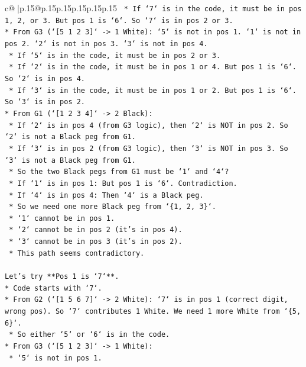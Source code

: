 \documentclass{article}
\begin{document}
{\begin{supertabular}{c@{$\;$}|p{.15\linewidth}@{}p{.15\linewidth}p{.15\linewidth}p{.15\linewidth}p{.15\linewidth}p{.15\linewidth}}
{{{\texttt{    *   If `7` is in the code, it must be in pos 1, 2, or 3. But pos 1 is `6`. So `7` is in pos 2 or 3.} \\
\texttt{*   From G3 (`{[}5 1 2 3{]}` {-}> 1 White): `5` is not in pos 1. `1` is not in pos 2. `2` is not in pos 3. `3` is not in pos 4.} \\
\texttt{    *   If `5` is in the code, it must be in pos 2 or 3.} \\
\texttt{    *   If `2` is in the code, it must be in pos 1 or 4. But pos 1 is `6`. So `2` is in pos 4.} \\
\texttt{    *   If `3` is in the code, it must be in pos 1 or 2. But pos 1 is `6`. So `3` is in pos 2.} \\
\texttt{*   From G1 (`{[}1 2 3 4{]}` {-}> 2 Black):} \\
\texttt{    *   If `2` is in pos 4 (from G3 logic), then `2` is NOT in pos 2. So `2` is not a Black peg from G1.} \\
\texttt{    *   If `3` is in pos 2 (from G3 logic), then `3` is NOT in pos 3. So `3` is not a Black peg from G1.} \\
\texttt{    *   So the two Black pegs from G1 must be `1` and `4`?} \\
\texttt{        *   If `1` is in pos 1: But pos 1 is `6`. Contradiction.} \\
\texttt{        *   If `4` is in pos 4: Then `4` is a Black peg.} \\
\texttt{    *   So we need one more Black peg from `\{1, 2, 3\}`.} \\
\texttt{        *   `1` cannot be in pos 1.} \\
\texttt{        *   `2` cannot be in pos 2 (it's in pos 4).} \\
\texttt{        *   `3` cannot be in pos 3 (it's in pos 2).} \\
\texttt{    *   This path seems contradictory.} \\
\\ 
\texttt{Let's try **Pos 1 is `7`**.} \\
\texttt{*   Code starts with `7`.} \\
\texttt{*   From G2 (`{[}1 5 6 7{]}` {-}> 2 White): `7` is in pos 1 (correct digit, wrong pos). So `7` contributes 1 White. We need 1 more White from `\{5, 6\}`.} \\
\texttt{    *   So either `5` or `6` is in the code.} \\
\texttt{*   From G3 (`{[}5 1 2 3{]}` {-}> 1 White):} \\
\texttt{    *   `5` is not in pos 1.} \\
}}}
\end{supertabular}}
\end{document}
